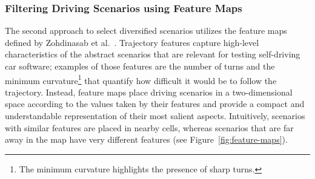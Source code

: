 \documentclass[conference]{IEEEtran}
\begin{document}

\subsubsection{Filtering Driving Scenarios using Feature Maps}
The second approach to select diversified scenarios utilizes the feature maps defined by Zohdinasab et al.~\cite{zohdinasab2021deephyperion}. 
Trajectory features capture high-level characteristics of the abstract scenarios that are relevant for testing self-driving car software; examples of those features are the number of turns and the minimum curvature\footnote{The minimum curvature highlights the presence of sharp turns.} that quantify how difficult it would be to follow the trajectory. Instead, feature maps place driving scenarios in a two-dimensional space according to the values taken by their features and provide a compact and understandable representation of their most salient aspects. Intuitively, scenarios with similar features are placed in nearby cells, whereas scenarios that are far away in the map have very different features (see Figure~\ref{fig:feature-maps}).
\end{document}
